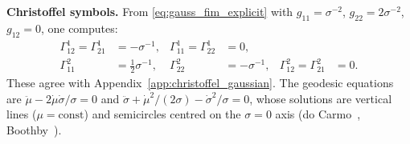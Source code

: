 \documentclass[a4paper,fleqn]{cas-dc}
\begin{document}
\textbf{Christoffel symbols.}
From \eqref{eq:gauss_fim_explicit} with $g_{11}=\sigma^{-2}$,
$g_{22}=2\sigma^{-2}$, $g_{12}=0$, one computes:
\begin{equation}
\begin{aligned}
  \Gamma^1_{12} = \Gamma^1_{21} &= -\sigma^{-1}, &
  \Gamma^1_{11} = \Gamma^1_{22} &= 0, \\
  \Gamma^2_{11} &= \tfrac{1}{2}\sigma^{-1}, &
  \Gamma^2_{22} &= -\sigma^{-1}, &
  \Gamma^2_{12} = \Gamma^2_{21} &= 0.
\end{aligned}
  \label{eq:gauss_christoffel_app}
\end{equation}
These agree with Appendix~\ref{app:christoffel_gaussian}.
The geodesic equations are
$\ddot\mu - 2\dot\mu\dot\sigma/\sigma = 0$ and
$\ddot\sigma + \dot\mu^2/(2\sigma) - \dot\sigma^2/\sigma = 0$,
whose solutions are vertical lines ($\mu=\mathrm{const}$) and
semicircles centred on the $\sigma=0$ axis
(do Carmo~\cite{do2002riemannian}, Boothby~\cite{boothby1986differentiable}).


\newpage

\end{document}

